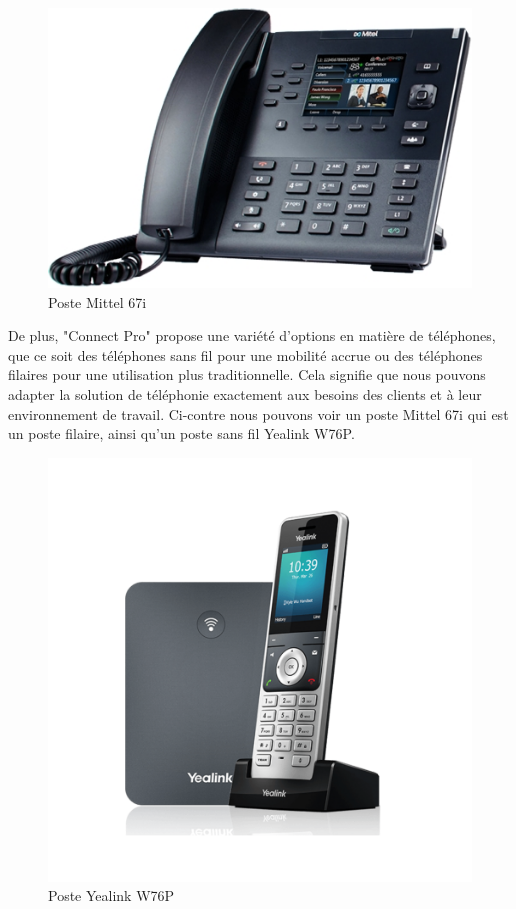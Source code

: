 \documentclass[12pt, a4paper]{article}
\begin{document}
\newpage
\begingroup
\setlength{\intextsep}{0pt}
\begin{figure}
	\includegraphics[scale=.5]{img/mittel.jpg}
	\caption{Poste Mittel 67i}
\end{figure}
De plus, "Connect Pro" propose une variété
d'options en matière de téléphones, que
ce soit des téléphones sans fil pour
une mobilité accrue ou des téléphones
filaires pour une utilisation plus
traditionnelle. Cela signifie que nous pouvons
adapter la solution de téléphonie exactement aux besoins
des clients et à leur environnement de travail.
Ci-contre nous pouvons voir un poste Mittel 67i
qui est un poste filaire, ainsi qu'un poste sans fil
Yealink W76P.\\
\begin{figure}
	\includegraphics[scale=.6]{img/yealink.png}
	\caption{Poste Yealink W76P}
\end{figure}
\end{document}
